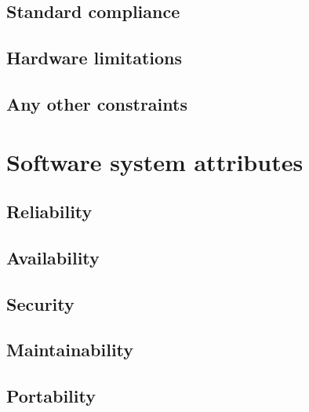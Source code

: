 \documentclass[a4paper, hidelinks, 12pt]{report}
\begin{document}
        \subsection{Standard compliance}\label{subsec:standard-compliance}
        \subsection{Hardware limitations}\label{subsec:hardware-limitations}
        \subsection{Any other constraints}\label{subsec:any-other-constraints}
    \section{Software system attributes}\label{sec:software-system-attributes}
        \subsection{Reliability}\label{subsec:reliability}
        \subsection{Availability}\label{subsec:availability}
        \subsection{Security}\label{subsec:security}
        \subsection{Maintainability}\label{subsec:maintainability}
        \subsection{Portability}\label{subsec:portability}
\end{document}
